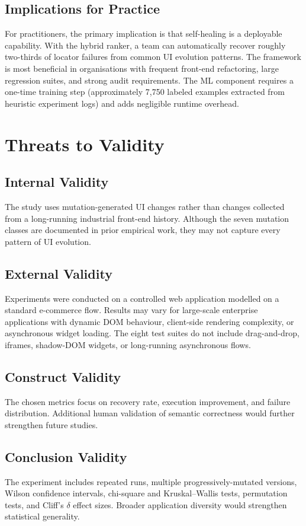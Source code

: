 \documentclass[12pt]{article}
\begin{document}
\subsection{Implications for Practice}

For practitioners, the primary implication is that self-healing is a deployable capability. With the hybrid ranker, a team can automatically recover roughly two-thirds of locator failures from common UI evolution patterns. The framework is most beneficial in organisations with frequent front-end refactoring, large regression suites, and strong audit requirements. The ML component requires a one-time training step (approximately 7,750 labeled examples extracted from heuristic experiment logs) and adds negligible runtime overhead.

\section{Threats to Validity}
\label{sec:validity}

\subsection{Internal Validity}
The study uses mutation-generated UI changes rather than changes collected from a long-running industrial front-end history. Although the seven mutation classes are documented in prior empirical work, they may not capture every pattern of UI evolution.

\subsection{External Validity}
Experiments were conducted on a controlled web application modelled on a standard e-commerce flow. Results may vary for large-scale enterprise applications with dynamic DOM behaviour, client-side rendering complexity, or asynchronous widget loading. The eight test suites do not include drag-and-drop, iframes, shadow-DOM widgets, or long-running asynchronous flows.

\subsection{Construct Validity}
The chosen metrics focus on recovery rate, execution improvement, and failure distribution. Additional human validation of semantic correctness would further strengthen future studies.

\subsection{Conclusion Validity}
The experiment includes repeated runs, multiple progressively-mutated versions, Wilson confidence intervals, chi-square and Kruskal--Wallis tests, permutation tests, and Cliff's $\delta$ effect sizes. Broader application diversity would strengthen statistical generality.
\end{document}
